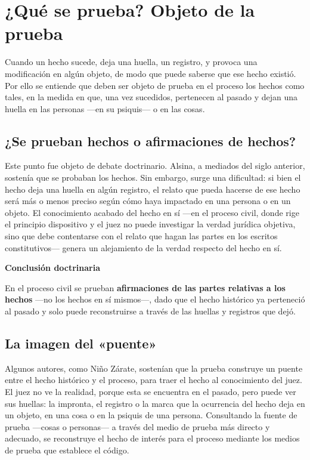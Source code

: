 \documentclass[12pt,oneside]{book}
\begin{document}
\section{¿Qué se prueba? Objeto de la prueba}

Cuando un hecho sucede, deja una huella, un registro, y provoca una modificación en algún objeto, de modo que puede saberse que ese hecho existió. Por ello se entiende que deben ser objeto de prueba en el proceso los hechos como tales, en la medida en que, una vez sucedidos, pertenecen al pasado y dejan una huella en las personas —en su psiquis— o en las cosas.

\subsection{¿Se prueban hechos o afirmaciones de hechos?}

Este punto fue objeto de debate doctrinario. Alsina, a mediados del siglo anterior, sostenía que se probaban los hechos. Sin embargo, surge una dificultad: si bien el hecho deja una huella en algún registro, el relato que pueda hacerse de ese hecho será más o menos preciso según cómo haya impactado en una persona o en un objeto. El conocimiento acabado del hecho en sí —en el proceso civil, donde rige el principio dispositivo y el juez no puede investigar la verdad jurídica objetiva, sino que debe contentarse con el relato que hagan las partes en los escritos constitutivos— genera un alejamiento de la verdad respecto del hecho en sí.

\begin{important}
\textbf{Conclusión doctrinaria}

En el proceso civil se prueban \textbf{afirmaciones de las partes relativas a los hechos} —no los hechos en sí mismos—, dado que el hecho histórico ya perteneció al pasado y solo puede reconstruirse a través de las huellas y registros que dejó.
\end{important}

\subsection{La imagen del «puente»}

Algunos autores, como Niño Zárate, sostenían que la prueba construye un puente entre el hecho histórico y el proceso, para traer el hecho al conocimiento del juez. El juez no ve la realidad, porque esta se encuentra en el pasado, pero puede ver sus huellas: la impronta, el registro o la marca que la ocurrencia del hecho deja en un objeto, en una cosa o en la psiquis de una persona. Consultando la fuente de prueba —cosas o personas— a través del medio de prueba más directo y adecuado, se reconstruye el hecho de interés para el proceso mediante los medios de prueba que establece el código.
\end{document}
